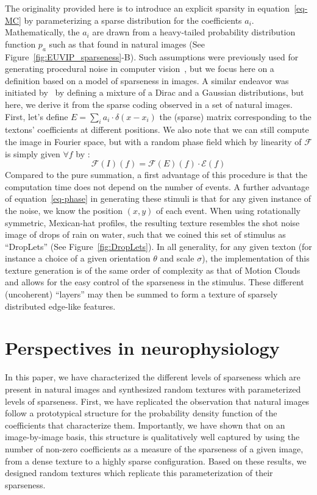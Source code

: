 \documentclass{article}
\newcommand{\eql}[1]{\begin{equation}#1\end{equation}}
\begin{document}
The originality provided here is to introduce an explicit sparsity in equation~\ref{eq-MC} by parameterizing a sparse distribution for the coefficients $a_i$. Mathematically, the $a_i$ are drawn from a heavy-tailed probability distribution function $p_a$ such as that found in natural images (See Figure~\ref{fig:EUVIP_sparseness}-B). Such assumptions were previously used for generating procedural noise in computer vision~\citep{Lagae09}, but we focus here on a definition based on a model of sparseness in images. A similar endeavor was initiated by~\citep{Sallee03} by defining a mixture of a Dirac and a Gaussian distributions, but here, we derive it from the sparse coding observed in a set of natural images. First, let's define $E=\sum_{i} a_i \cdot\delta(x-x_i)$ the (sparse) matrix corresponding to the textons' coefficients at different positions. We also note that we can still compute the image in Fourier space, but with a random phase field which by linearity of $\mathcal{F}$ is simply given $\forall f$ by : \eql{\label{eq-phase}   \mathcal{F}(I) (f) = \mathcal{F}(E)(f) \cdot \mathcal{E} (f)} Compared to the pure summation, a first advantage of this procedure is that the computation time does not depend on the number of events. A further advantage of equation~\ref{eq-phase} in generating these stimuli is that for any given instance of the noise, we know the position $(x, y)$ of each event. When using rotationally symmetric, Mexican-hat profiles, the resulting texture resembles the shot noise image of drops of rain on water, such that we coined this set of stimulus as ``DropLets'' (See Figure~\ref{fig:DropLets}). In all generality, for any given texton (for instance a choice of a given orientation $\theta$ and scale $\sigma$), the implementation of this texture generation is of the same order of complexity as that of Motion Clouds and allows for the easy control of the sparseness in the stimulus. These different (uncoherent) ``layers'' may then be summed to form a texture of sparsely distributed edge-like features.
\section{Perspectives in neurophysiology}
In this paper, we have characterized the different levels of sparseness which are present in natural images and synthesized random textures with parameterized levels of sparseness. First, we have replicated the observation that natural images follow a prototypical structure for the probability density function of the coefficients that characterize them. Importantly, we have shown that on an image-by-image basis, this structure is qualitatively well captured by using the number of non-zero coefficients as a measure of the sparseness of a given image, from a dense texture to a highly sparse configuration. Based on these results, we designed random textures which replicate this parameterization of their sparseness.
\end{document}
